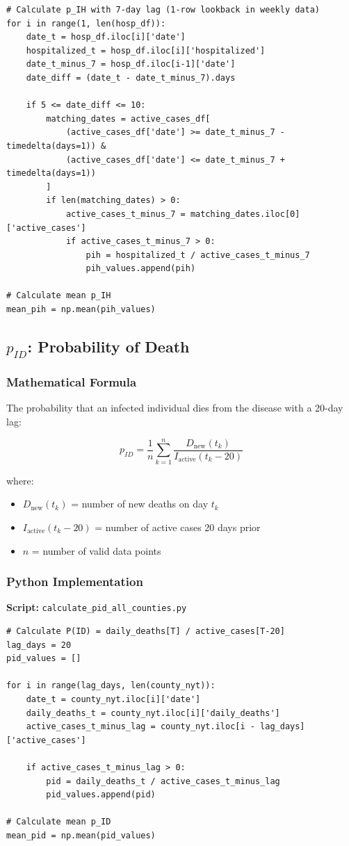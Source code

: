 \documentclass[11pt]{article}
\begin{document}
\begin{lstlisting}
# Calculate p_IH with 7-day lag (1-row lookback in weekly data)
for i in range(1, len(hosp_df)):
    date_t = hosp_df.iloc[i]['date']
    hospitalized_t = hosp_df.iloc[i]['hospitalized']
    date_t_minus_7 = hosp_df.iloc[i-1]['date']
    date_diff = (date_t - date_t_minus_7).days
    
    if 5 <= date_diff <= 10:
        matching_dates = active_cases_df[
            (active_cases_df['date'] >= date_t_minus_7 - timedelta(days=1)) &
            (active_cases_df['date'] <= date_t_minus_7 + timedelta(days=1))
        ]
        if len(matching_dates) > 0:
            active_cases_t_minus_7 = matching_dates.iloc[0]['active_cases']
            if active_cases_t_minus_7 > 0:
                pih = hospitalized_t / active_cases_t_minus_7
                pih_values.append(pih)

# Calculate mean p_IH
mean_pih = np.mean(pih_values)
\end{lstlisting}


\subsection{$p_{ID}$: Probability of Death}

\subsubsection{Mathematical Formula}
The probability that an infected individual dies from the disease with a 20-day lag:

\[
p_{ID} = \frac{1}{n} \sum_{k=1}^{n} \frac{D_{\text{new}}(t_k)}{I_{\text{active}}(t_k - 20)}
\]

where:
\begin{itemize}
    \item $D_{\text{new}}(t_k)$ = number of new deaths on day $t_k$
    \item $I_{\text{active}}(t_k - 20)$ = number of active cases 20 days prior
    \item $n$ = number of valid data points
\end{itemize}

\subsubsection{Python Implementation}
\textbf{Script:} \texttt{calculate\_pid\_all\_counties.py}

\begin{lstlisting}
# Calculate P(ID) = daily_deaths[T] / active_cases[T-20]
lag_days = 20
pid_values = []

for i in range(lag_days, len(county_nyt)):
    date_t = county_nyt.iloc[i]['date']
    daily_deaths_t = county_nyt.iloc[i]['daily_deaths']
    active_cases_t_minus_lag = county_nyt.iloc[i - lag_days]['active_cases']
    
    if active_cases_t_minus_lag > 0:
        pid = daily_deaths_t / active_cases_t_minus_lag
        pid_values.append(pid)

# Calculate mean p_ID
mean_pid = np.mean(pid_values)
\end{lstlisting}
\end{document}
